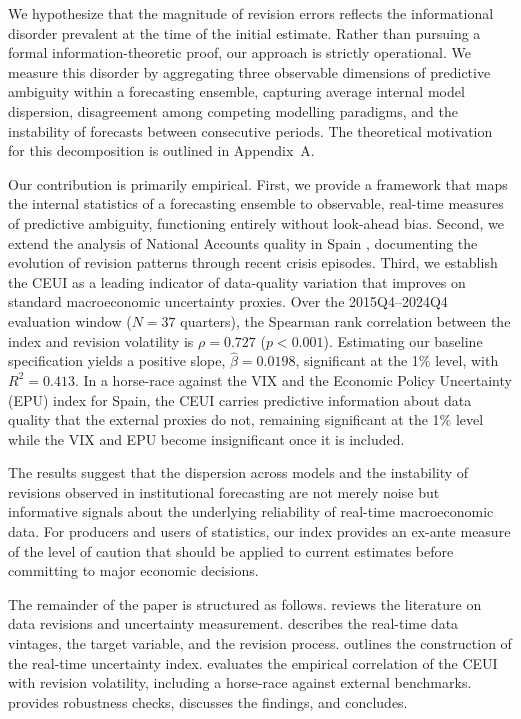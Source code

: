 \documentclass[12pt,a4paper]{article}
\theoremstyle{remark}
\begin{document}
We hypothesize that the magnitude of revision errors reflects the informational disorder prevalent at the time of the initial estimate. Rather than pursuing a formal information-theoretic proof, our approach is strictly operational. We measure this disorder by aggregating three observable dimensions of predictive ambiguity within a forecasting ensemble, capturing average internal model dispersion, disagreement among competing modelling paradigms, and the instability of forecasts between consecutive periods. The theoretical motivation for this decomposition is outlined in Appendix~A.

Our contribution is primarily empirical. First, we provide a framework that maps the internal statistics of a forecasting ensemble to observable, real-time measures of predictive ambiguity, functioning entirely without look-ahead bias. Second, we extend the analysis of National Accounts quality in Spain \citep{pavia2018}, documenting the evolution of revision patterns through recent crisis episodes. Third, we establish the CEUI as a leading indicator of data-quality variation that improves on standard macroeconomic uncertainty proxies. Over the 2015Q4--2024Q4 evaluation window ($N = 37$ quarters), the Spearman rank correlation between the index and revision volatility is $\rho = 0.727$ ($p < 0.001$). Estimating our baseline specification yields a positive slope, $\hat{\beta} = 0.0198$, significant at the 1\% level, with $R^2 = 0.413$. In a horse-race against the VIX and the Economic Policy Uncertainty (EPU) index for Spain, the CEUI carries predictive information about data quality that the external proxies do not, remaining significant at the 1\% level while the VIX and EPU become insignificant once it is included.

The results suggest that the dispersion across models and the instability of revisions observed in institutional forecasting are not merely noise but informative signals about the underlying reliability of real-time macroeconomic data. For producers and users of statistics, our index provides an ex-ante measure of the level of caution that should be applied to current estimates before committing to major economic decisions.

The remainder of the paper is structured as follows.  reviews the literature on data revisions and uncertainty measurement.  describes the real-time data vintages, the target variable, and the revision process.  outlines the construction of the real-time uncertainty index.  evaluates the empirical correlation of the CEUI with revision volatility, including a horse-race against external benchmarks.  provides robustness checks,  discusses the findings, and  concludes.
\end{document}
